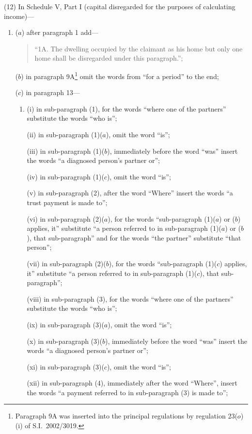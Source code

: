 \documentclass[12pt,a4paper]{article}
\begin{document}
(12) In Schedule V, Part I (capital disregarded for the purposes of calculating income)—
\begin{enumerate}\item[]
($a$) after paragraph 1 add—
\begin{quotation}
“1A.  The dwelling occupied by the claimant as his home but only one home shall be disregarded under this paragraph.”;
\end{quotation}

($b$) in paragraph 9A\footnote{Paragraph 9A was inserted into the principal regulations by regulation 23($o$)(i) of S.I.\ 2002/3019.} omit the words from “for a period” to the end;

($c$) in paragraph 13—
\begin{enumerate}\item[]
(i) in sub-paragraph (1), for the words “where one of the partners” substitute the words “who is”;

(ii) in sub-paragraph (1)($a$), omit the word “is”;

(iii) in sub-paragraph (1)($b$), immediately before the word “was” insert the words “a diagnosed person’s partner or”;

(iv) in sub-paragraph (1)($c$), omit the word “is”;

(v) in sub-paragraph (2), after the word “Where” insert the words “a trust payment is made to”;

(vi) in sub-paragraph (2)($a$), for the words “sub-paragraph (1)($a$)  or ($b$)  applies, it” substitute “a person referred to in sub-paragraph (1)($a$)  or ($b$), that sub-paragraph” and for the words “the partner” substitute “that person”;

(vii) in sub-paragraph (2)($b$), for the words “sub-paragraph (1)($c$)  applies, it” substitute “a person referred to in sub-paragraph (1)($c$), that sub-paragraph”;

(viii) in sub-paragraph (3), for the words “where one of the partners” substitute the words “who is”;

(ix) in sub-paragraph (3)($a$), omit the word “is”;

(x) in sub-paragraph (3)($b$), immediately before the word “was” insert the words “a diagnosed person’s partner or”;

(xi) in sub-paragraph (3)($c$), omit the word “is”;

(xii) in sub-paragraph (4), immediately after the word “Where”, insert the words “a payment referred to in sub-paragraph (3) is made to”;


\end{enumerate}
\end{enumerate}
\end{document}
